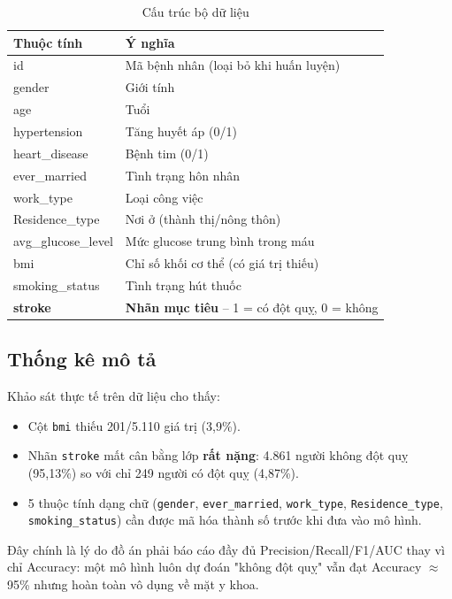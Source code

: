 \documentclass[12pt,a4paper]{report}
\begin{document}
\begin{table}[H]
\centering
\caption{Cấu trúc bộ dữ liệu}
\label{tab:cotdulieu}
\begin{tabular}{ll}
\toprule
\textbf{Thuộc tính} & \textbf{Ý nghĩa} \\
\midrule
id & Mã bệnh nhân (loại bỏ khi huấn luyện) \\
gender & Giới tính \\
age & Tuổi \\
hypertension & Tăng huyết áp (0/1) \\
heart\_disease & Bệnh tim (0/1) \\
ever\_married & Tình trạng hôn nhân \\
work\_type & Loại công việc \\
Residence\_type & Nơi ở (thành thị/nông thôn) \\
avg\_glucose\_level & Mức glucose trung bình trong máu \\
bmi & Chỉ số khối cơ thể (có giá trị thiếu) \\
smoking\_status & Tình trạng hút thuốc \\
\textbf{stroke} & \textbf{Nhãn mục tiêu} -- 1 = có đột quỵ, 0 = không \\
\bottomrule
\end{tabular}
\end{table}

\subsection{Thống kê mô tả}

Khảo sát thực tế trên dữ liệu cho thấy:
\begin{itemize}
    \item Cột \texttt{bmi} thiếu 201/5.110 giá trị (3,9\%).
    \item Nhãn \texttt{stroke} mất cân bằng lớp \textbf{rất nặng}: 4.861 người không đột quỵ (95,13\%) so với chỉ 249 người có đột quỵ (4,87\%).
    \item 5 thuộc tính dạng chữ (\texttt{gender}, \texttt{ever\_married}, \texttt{work\_type}, \texttt{Residence\_type}, \texttt{smoking\_status}) cần được mã hóa thành số trước khi đưa vào mô hình.
\end{itemize}

Đây chính là lý do đồ án phải báo cáo đầy đủ Precision/Recall/F1/AUC thay vì chỉ Accuracy: một mô hình luôn dự đoán "không đột quỵ" vẫn đạt Accuracy $\approx$ 95\% nhưng hoàn toàn vô dụng về mặt y khoa.
\end{document}
